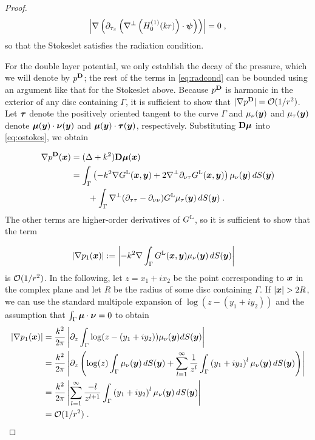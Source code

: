 \begin{proof}
\begin{equation}
\left | \nabla \left( \partial_{\tau_x} \left ( 
\nabla^\perp \left (H_0^{(1)} (kr) \right ) \cdot {\boldsymbol \psi}  \right )
\right) \right | = 0 \; , \nonumber
\end{equation}
so that the Stokeslet satisfies the radiation condition.

For the double layer potential, we only establish the
decay of the pressure, which we will denote by $p^{\bf D}$;
the rest of the terms in \eqref{eq:radcond} can be bounded
using an argument like that for the Stokeslet above.
Because $p^{\bf D}$ is harmonic in the exterior of any disc
containing $\Gamma$, it is sufficient to show that
$|\nabla p^{\bf D}| = \mathcal{O} (1/r^2)$. Let ${\boldsymbol \tau}$ denote the
positively oriented tangent to the curve $\Gamma$ and
$\mu_\nu({\boldsymbol y})$ and $\mu_\tau({\boldsymbol y})$ denote ${\boldsymbol \mu}({\boldsymbol y}) \cdot {\boldsymbol \nu}({\boldsymbol y})$ and
${\boldsymbol \mu}({\boldsymbol y}) \cdot {\boldsymbol \tau}({\boldsymbol y})$, respectively. Substituting
${\bf D} {\boldsymbol \mu}$ into \eqref{eq:ostokes}, we obtain

\begin{align*}
\nabla p^{\bf D}({\boldsymbol x}) &= (\Delta + k^2) {\bf D} {\boldsymbol \mu}({\boldsymbol x}) \\
&= \int_\Gamma \left (-k^2 \nabla G^{\textrm{L}} ({\boldsymbol x},{\boldsymbol y}) +
2 \nabla^\perp \partial_{\nu\tau} G^{\textrm{L}} ({\boldsymbol x},{\boldsymbol y}) \right ) \mu_\nu({\boldsymbol y})
\, dS({\boldsymbol y}) \\
& \qquad + \int_\Gamma \nabla^\perp (\partial_{\tau\tau}-\partial_{\nu\nu})G^{\textrm{L}} \mu_\tau({\boldsymbol y})
\, dS({\boldsymbol y}) \; .
\end{align*}
The other terms are higher-order derivatives
of $G^{\textrm{L}}$, so it is sufficient to show that the term

\begin{align*}
|\nabla p_1({\boldsymbol x})| &:= \left |-k^2 \nabla \int_\Gamma G^{\textrm{L}}({\boldsymbol x},{\boldsymbol y})
\mu_\nu({\boldsymbol y}) \, dS({\boldsymbol y}) \right |
\end{align*}
is $\mathcal{O} (1/r^2)$. In the following, let $z = x_1 + i x_2$ be the
point corresponding to ${\boldsymbol x}$ in the complex plane and let $R$
be the radius of some disc containing $\Gamma$. If $|{\boldsymbol x}| > 2R$,
we can use the standard multipole expansion of $\log(z-(y_1+iy_2))$
and the assumption that $\int_\Gamma {\boldsymbol \mu} \cdot {\boldsymbol \nu} = 0$
to obtain
\begin{align*}
|\nabla p_1({\boldsymbol x})| &= \frac{k^2}{2\pi} \left |  \partial_z \int_\Gamma \log(z-(y_1+iy_2))
\mu_\nu({\boldsymbol y}) dS({\boldsymbol y}) \right | \\
&= \frac{k^2}{2\pi} \left |  \partial_z  \left ( \log(z) \int_\Gamma \mu_\nu({\boldsymbol y}) \, dS({\boldsymbol y})
+ \sum_{l=1}^\infty \frac{1}{z^l} \int_\Gamma \left( y_1+iy_2 \right)^l \mu_\nu({\boldsymbol y}) \, dS({\boldsymbol y})
\right ) \right | \\
&= \frac{k^2}{2\pi} \left | \sum_{l=1}^\infty \frac{-l}{z^{l+1}}
\int_\Gamma \left( y_1+iy_2 \right)^l \mu_\nu({\boldsymbol y}) \, dS({\boldsymbol y}) \right | \\
&= \mathcal{O} (1/r^2) \; .
\end{align*}
\end{proof}

